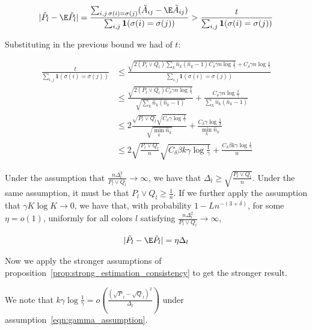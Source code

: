 \documentclass{article}
\begin{document}
\begin{align*}
| \hat{P}_l - \E \hat{P}_l | =
\frac{\sum_{i,j \, \sigma(i) = \sigma(j)} (\tilde{A}_{ij} - \E \tilde{A}_{ij} ) }{
  \sum_{i,j} \mathbf{1}( \sigma(i) = \sigma(j) ) } &> 
  \frac{t}{\sum_{i,j} \mathbf{1}(\sigma(i) = \sigma(j)) } \\
\end{align*}

Substituting in the previous bound we had of $t$:

\begin{align*}
 \frac{t}{\sum_{i,j} \mathbf{1}(\sigma(i) = \sigma(j)) } &\leq
   \frac{  \sqrt{  2 (P_l \vee Q_l) \sum_k \hat{n}_k (\hat{n}_k - 1) C_\delta \gamma n \log \frac{1}{\gamma} } + C_\delta \gamma n \log \frac{1}{\gamma} }
        { \sum_{i,j} \mathbf{1}(\sigma(i) = \sigma(j) ) }  \\
  &\leq \frac{\sqrt{2 (P_l \vee Q_l) C_\delta \gamma n \log \frac{1}{\gamma}}}
             {\sqrt{ \sum_k \hat{n}_k (\hat{n}_k - 1)}} + 
          \frac{C_\delta \gamma n \log \frac{1}{\gamma}}
             {\sum_k \hat{n}_k (\hat{n}_k - 1)} \\
 &\leq 2 \frac{ \sqrt{P_l\vee Q_l} \sqrt{ C_\delta \gamma \log \frac{1}{\gamma}} }
           {\sqrt{ \min_k \hat{n}_k}} + 
       \frac{C_\delta \gamma \log \frac{1}{\delta}}{\min_k \hat{n}_k} \\
 &\leq 2 \sqrt{ \frac{P_l \vee Q_l}{n} } \sqrt{C_\delta \beta k \gamma \log \frac{1}{\gamma}} + 
       \frac{C_\delta \beta k \gamma \log \frac{1}{\gamma}}{n} 
\end{align*}

Under the assumption that $\frac{ n \Delta_l^2}{P_l \vee Q_l} \rightarrow \infty$, we have that $\Delta_l \geq \sqrt{ \frac{P_l \vee Q_l}{n}}$. Under the same assumption, it must be that $P_l \vee Q_l \geq \frac{1}{n}$. If we further apply the assumption that $\gamma K \log K \rightarrow 0$, we have that, with probability $1 - L n^{-(3+\delta)}$, for some $\eta = o(1)$, uniformly for all colors $l$ satisfying $\frac{n \Delta_l^2}{P_l \vee Q_l} \rightarrow \infty$, 

\begin{align*}
| \hat{P}_l - \E \hat{P}_l | = \eta \Delta_l
\end{align*}

Now we apply the stronger assumptions of proposition~\ref{prop:strong_estimation_consistency} to get the stronger result. 

We note that $k \gamma \log \frac{1}{\gamma} = o\left( \frac{(\sqrt{P}_l - \sqrt{Q}_l)^2}{\Delta_l} \right)$ under assumption~\ref{eqn:gamma_assumption}. 
\end{document}
